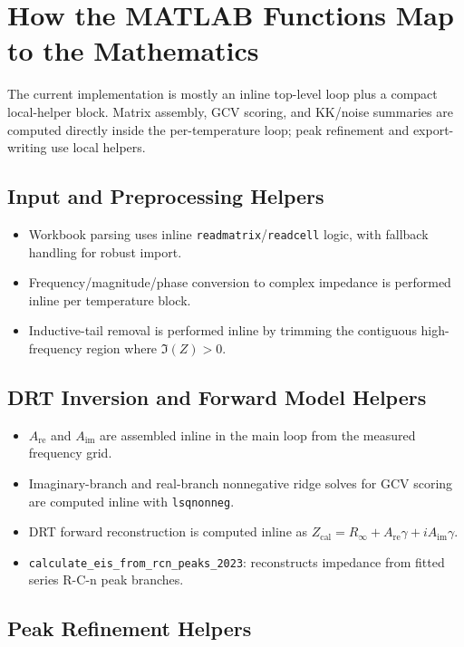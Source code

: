 \documentclass[11pt]{article}
\begin{document}
\section{How the MATLAB Functions Map to the Mathematics}

The current implementation is mostly an inline top-level loop plus a compact local-helper block. Matrix assembly, GCV scoring, and KK/noise summaries are computed directly inside the per-temperature loop; peak refinement and export-writing use local helpers.

\subsection*{Input and Preprocessing Helpers}

\begin{itemize}
\item Workbook parsing uses inline \texttt{readmatrix}/\texttt{readcell} logic, with fallback handling for robust import.
\item Frequency/magnitude/phase conversion to complex impedance is performed inline per temperature block.
\item Inductive-tail removal is performed inline by trimming the contiguous high-frequency region where $\Im(Z)>0$.
\end{itemize}

\subsection*{DRT Inversion and Forward Model Helpers}

\begin{itemize}
\item $A_{\mathrm{re}}$ and $A_{\mathrm{im}}$ are assembled inline in the main loop from the measured frequency grid.
\item Imaginary-branch and real-branch nonnegative ridge solves for GCV scoring are computed inline with \texttt{lsqnonneg}.
\item DRT forward reconstruction is computed inline as $Z_{\mathrm{cal}} = R_\infty + A_{\mathrm{re}}\gamma + iA_{\mathrm{im}}\gamma$.
\item \texttt{calculate\_eis\_from\_rcn\_peaks\_2023}: reconstructs impedance from fitted series R-C-n peak branches.
\end{itemize}

\subsection*{Peak Refinement Helpers}
\end{document}
